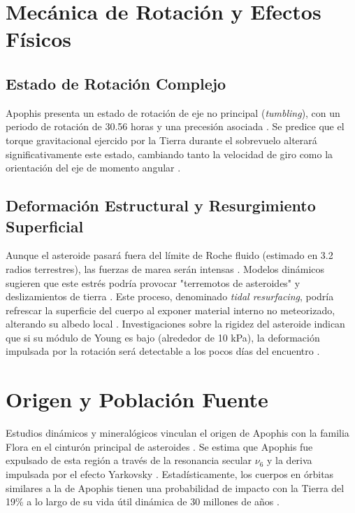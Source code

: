 \documentclass[a4paper]{article}
\begin{document}
\section{Mecánica de Rotación y Efectos Físicos}

\subsection{Estado de Rotación Complejo}
Apophis presenta un estado de rotación de eje no principal (\textit{tumbling}), con un periodo de rotación de 30.56 horas y una precesión asociada \cite{nasa2025apophisfacts, hirabayashi2024prediction, jpl2024sbdb}. Se predice que el torque gravitacional ejercido por la Tierra durante el sobrevuelo alterará significativamente este estado, cambiando tanto la velocidad de giro como la orientación del eje de momento angular \cite{vallejo2022conditions, hirabayashi2024prediction}.

\subsection{Deformación Estructural y Resurgimiento Superficial}
Aunque el asteroide pasará fuera del límite de Roche fluido (estimado en 3.2 radios terrestres), las fuerzas de marea serán intensas \cite{kim2023tidal, hirabayashi2024prediction}. Modelos dinámicos sugieren que este estrés podría provocar "terremotos de asteroides" y deslizamientos de tierra \cite{nasa2025apophisfacts, esa2024ramses}. Este proceso, denominado \textit{tidal resurfacing}, podría refrescar la superficie del cuerpo al exponer material interno no meteorizado, alterando su albedo local \cite{broz2026apophis, kim2023tidal}. Investigaciones sobre la rigidez del asteroide indican que si su módulo de Young es bajo (alrededor de 10 kPa), la deformación impulsada por la rotación será detectable a los pocos días del encuentro \cite{hirabayashi2024prediction}.

\section{Origen y Población Fuente}
Estudios dinámicos y mineralógicos vinculan el origen de Apophis con la familia Flora en el cinturón principal de asteroides \cite{broz2026apophis}. Se estima que Apophis fue expulsado de esta región a través de la resonancia secular $\nu_6$ y la deriva impulsada por el efecto Yarkovsky \cite{broz2026apophis, vallejo2022conditions}. Estadísticamente, los cuerpos en órbitas similares a la de Apophis tienen una probabilidad de impacto con la Tierra del 19\% a lo largo de su vida útil dinámica de 30 millones de años \cite{broz2026apophis}.
\end{document}
